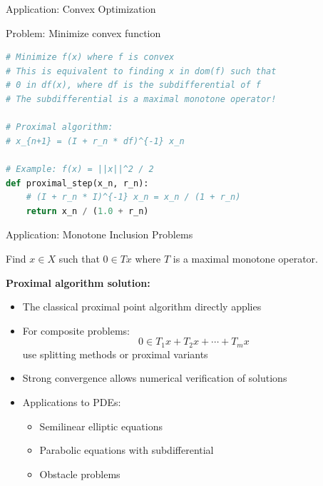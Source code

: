 \documentclass[aspectratio=169,10pt]{beamer}
\begin{document}
\begin{frame}[fragile]{Application: Convex Optimization}
    \begin{block}{Problem: Minimize convex function}
        \begin{lstlisting}[language=Python]
# Minimize f(x) where f is convex
# This is equivalent to finding x in dom(f) such that
# 0 in df(x), where df is the subdifferential of f
# The subdifferential is a maximal monotone operator!

# Proximal algorithm:
# x_{n+1} = (I + r_n * df)^{-1} x_n

# Example: f(x) = ||x||^2 / 2
def proximal_step(x_n, r_n):
    # (I + r_n * I)^{-1} x_n = x_n / (1 + r_n)
    return x_n / (1.0 + r_n)
        \end{lstlisting}
    \end{block}
\end{frame}

\begin{frame}{Application: Monotone Inclusion Problems}
    \begin{problem}
        Find $x \in X$ such that $0 \in Tx$ where $T$ is a maximal monotone operator.
    \end{problem}

    \vspace{0.3cm}
    \textbf{Proximal algorithm solution:}
    \begin{itemize}
        \item The classical proximal point algorithm directly applies

        \item For composite problems:
        \[
            0 \in T_1 x + T_2 x + \cdots + T_m x
        \]
        use splitting methods or proximal variants

        \item Strong convergence allows numerical verification of solutions

        \item Applications to PDEs:
        \begin{itemize}
            \item Semilinear elliptic equations
            \item Parabolic equations with subdifferential
            \item Obstacle problems
        \end{itemize}
    \end{itemize}
\end{frame}
\end{document}
